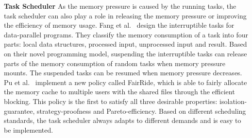 \textbf{Task Scheduler} As the memory pressure is caused by the running tasks, the task scheduler can also play a role in releasing the memory pressure or improving the efficiency of memory usage. Fang et al.~\cite{fang2015interruptible} design the interruptible tasks for data-parallel programs. They classify the memory consumption of a task into four parts: local data structures, processed input, unprocessed input and result. Based on their novel programming model, suspending the interruptible tasks can release parts of the memory consumption of random tasks when memory pressure mounts. The suspended tasks can be resumed when memory pressure decreases. 
Pu et al.~\cite{pu2016fairride} implement a new policy called FairRide, which  is able to fairly allocate the memory cache to multiple users with the shared files through the efficient blocking. This policy is the first to satisfy all three desirable properties: isolation-guarantee, strategy-proofness and Pareto-efficiency. Based on different scheduling standards, the task scheduler always adapts to different demands and is easy to be implemented.
